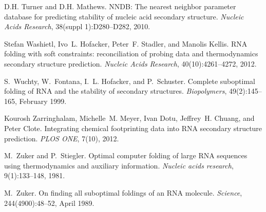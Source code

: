 \begin{DoxyDescription}
\item[\label{_CITEREF_turner:2010}%
\mbox{[}16\mbox{]}]D.\+H. Turner and D.\+H. Mathews. N\+N\+DB\+: The nearest neighbor parameter database for predicting stability of nucleic acid secondary structure. {\itshape Nucleic Acids Research}, 38(suppl 1)\+:D280--D282, 2010.


\item[\label{_CITEREF_washietl:2012}%
\mbox{[}17\mbox{]}]Stefan Washietl, Ivo~L. Hofacker, Peter~F. Stadler, and Manolis Kellis. R\+NA folding with soft constraints\+: reconciliation of probing data and thermodynamics secondary structure prediction. {\itshape Nucleic Acids Research}, 40(10)\+:4261--4272, 2012.


\item[\label{_CITEREF_wuchty:1999}%
\mbox{[}18\mbox{]}]S.~Wuchty, W.~Fontana, I.~L. Hofacker, and P.~Schuster. Complete suboptimal folding of R\+NA and the stability of secondary structures. {\itshape Biopolymers}, 49(2)\+:145--165, February 1999.


\item[\label{_CITEREF_zarringhalam:2012}%
\mbox{[}19\mbox{]}]Kourosh Zarringhalam, Michelle~M. Meyer, Ivan Dotu, Jeffrey~H. Chuang, and Peter Clote. Integrating chemical footprinting data into R\+NA secondary structure prediction. {\itshape P\+L\+OS O\+NE}, 7(10), 2012.


\item[\label{_CITEREF_zuker:1981}%
\mbox{[}20\mbox{]}]M.~Zuker and P.~Stiegler. Optimal computer folding of large R\+NA sequences using thermodynamics and auxiliary information. {\itshape Nucleic acids research}, 9(1)\+:133--148, 1981.


\item[\label{_CITEREF_zuker:1989}%
\mbox{[}21\mbox{]}]M.~Zuker. On finding all suboptimal foldings of an R\+NA molecule. {\itshape Science}, 244(4900)\+:48--52, April 1989.


\end{DoxyDescription}